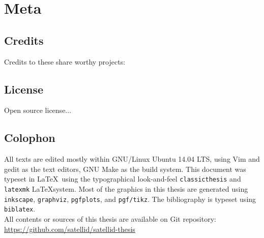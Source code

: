 \chapter*{Meta}
\label{chap:meta}

\section*{Credits}
\label{sec:credits}

Credits to these share worthy projects:

\section*{License}
\label{sec:license}

Open source license...

\section*{Colophon}
\label{sec:colophon}

All texts are edited mostly within GNU/Linux Ubuntu 14.04 LTS, using Vim and gedit as the text editors, GNU Make as the build system.
This document was typeset in \LaTeX~using the typographical look-and-feel \texttt{classicthesis} and \verb|latexmk| \LaTeX system.
Most of the graphics in this thesis are generated using \texttt{inkscape}, \texttt{graphviz}, \texttt{pgfplots}, and \texttt{pgf/tikz}.
The bibliography is typeset using \texttt{biblatex}.
\\
All contents or sources of this thesis are available on Git repository:\\
\url{https://github.com/satellid/satellid-thesis}
